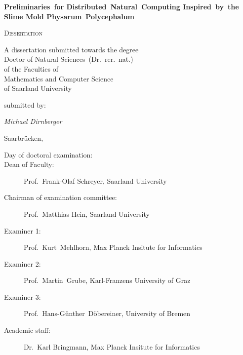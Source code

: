 
\begin{titlepage}
	\centering
	\null\vfill
	
	{\huge\bfseries Preliminaries~for Distributed~Natural~Computing Inspired~by~the Slime Mold Physarum~Polycephalum\par}
	


	\vfill

	{\scshape\Large Dissertation}
	\vfill


	{\large A dissertation submitted towards the degree\\
	Doctor of Natural Sciences~(Dr.~rer.~nat.)\\
	of the Faculties of\\
	Mathematics and Computer Science\\
	of Saarland University}


	\vfill
	submitted by:
	\vfill

	{\Large\itshape Michael Dirnberger}

	\vfill

	{\large Saarbr\"ucken, \thesisdate{}}
	\vfill
\end{titlepage}


\newpage
\thispagestyle{plain}
\null
\vfill
\begin{description}
	\item[Day of doctoral examination:] 
 	\item[Dean of Faculty:] Prof.~Frank-Olaf Schreyer, Saarland University
 	\item[Chairman of examination committee:] Prof.~Matthias Hein, Saarland University
	\item[Examiner 1:] Prof.~Kurt~Mehlhorn, Max Planck Insitute for Informatics
	\item[Examiner 2:] Prof.~Martin~Grube, Karl-Franzens University of Graz
	\item[Examiner 3:] Prof.~Hans-G\"unther~D\"obereiner, University of Bremen
	\item[Academic staff:] Dr.~Karl Bringmann, Max Planck Insitute for Informatics
\end{description}

\newpage
